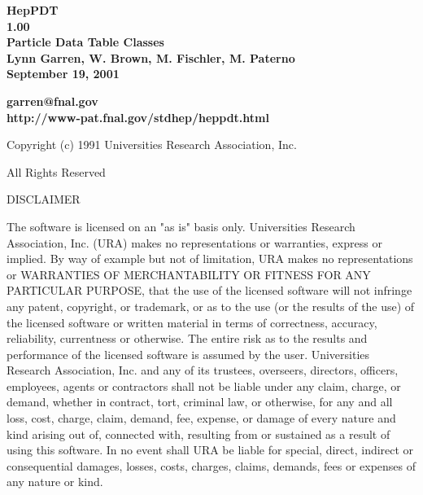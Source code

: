 \begin{titlepage}

{}

\vspace{2.0in}
\begin{center}
  {\LARGE\bf  HepPDT \\ 1.00 \\}
  {\Large\bf  Particle Data Table Classes \\}
  {\Large\bf  Lynn Garren, W. Brown, M. Fischler, M. Paterno \\}
  {\Large\bf  September 19, 2001 \\}
\end{center}
\vspace{2.0in}
\begin{center}
  {\large\bf  garren@fnal.gov \\}
  {\large\bf  http://www-pat.fnal.gov/stdhep/heppdt.html \\}
\end{center}

\end{titlepage}

\vspace{0.5in}
\centerline{ Copyright (c) 1991   Universities Research Association, Inc. }
\centerline{   All Rights Reserved }
\vspace{0.2in}
\centerline{ DISCLAIMER }

The software is licensed on an "as is" basis only.  Universities Research
Association, Inc. (URA) makes no representations or warranties, express
or implied.  By way of example but not of limitation, URA makes no
representations or WARRANTIES OF MERCHANTABILITY OR FITNESS FOR ANY
PARTICULAR PURPOSE, that  the use of the licensed software will not
infringe any patent, copyright, or trademark, or as to the use (or the
results of the use) of the licensed  software or written material in
terms of correctness, accuracy, reliability, currentness or otherwise.
The entire risk as to the results and performance of the  licensed
software is assumed by the user.  Universities Research Association, Inc.
and any of its trustees, overseers, directors, officers, employees,
agents or contractors shall not be liable under any claim, charge, or
demand, whether in contract, tort, criminal law, or otherwise, for any
and all loss, cost, charge, claim, demand, fee, expense, or damage of
every nature and kind arising out of, connected with, resulting from or
sustained as a result of using this software. In no event shall URA be
liable for special, direct, indirect or consequential damages, losses,
costs, charges, claims, demands, fees or expenses of any  nature or kind.
 
